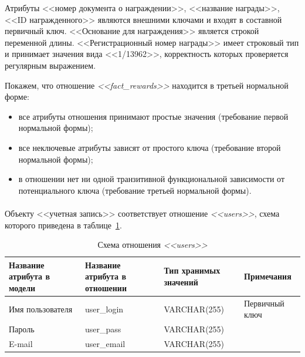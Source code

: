 Атрибуты <<номер документа о награждении>>, <<название награды>>,
<<ID награжденного>> являются внешними ключами и входят в составной 
первичный ключ.
<<Основание для награждения>> является строкой переменной длины.
<<Регистрационный номер награды>> имеет строковый тип и принимает значения вида
<<1/13962>>, корректность которых проверяется регулярным выражением.

Покажем, что отношение \textit{<<fact\_rewards>>} находится в третьей нормальной форме:
\begin{itemize}
\item
  все атрибуты отношения принимают простые значения
  (требование первой нормальной формы);
\item
  все неключевые атрибуты зависят от простого ключа
  (требование второй нормальной формы); 
\item
  в отношении нет ни одной транзитивной функциональной зависимости
  от потенциального ключа (требование третьей нормальной формы).
\end{itemize}

\paragraph{}
Объекту <<учетная запись>> соответствует отношение \textit{<<users>>},
схема которого приведена в таблице~\ref{tbl:users_scheme}.

\begin{table}[h!]
  \caption{Схема отношения \textit{<<users>>}}
  \label{tbl:users_scheme}
  \small{
    \centering
    \begin{tabular}{| p{} | p{} | p{} | p{} |}
      \hline
      Название атрибута \newline в модели &
      Название атрибута \newline в отношении &
      Тип хранимых \newline значений &
      Примечания \\ \hline

      Имя пользователя &
      user\_login &
      VARCHAR(255) &
      Первичный ключ \\
      \hline

      Пароль &
      user\_pass &
      VARCHAR(255) & \\
      \hline

      E-mail &
      user\_email &
      VARCHAR(255) & \\
      \hline
    \end{tabular}
  }
\end{table}

